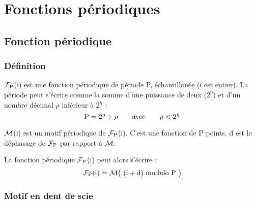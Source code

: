 
\chapter{Fonctions périodiques}

\section{Fonction périodique}
\subsection{Définition}
$\mathcal{F}_{\text{P}}$(i) est une fonction périodique de période P, échantillonée (i est
entier). La période peut s'écrire comme la somme d'une puissance de deux ($2^\eta$)
et d'un nombre décimal $\rho$ inférieur à $2^\eta$ :
\[
\text{P}=2^\eta+\rho\qquad\text{avec}\qquad\rho<2^\eta
\]

$\mathcal{M}$(i) est un motif périodique de $\mathcal{F}_{\text{P}}$(i). C'est une fonction de P
points. d est le déphasage de $\mathcal{F}_{\text{P}}$ par rapport à $\mathcal{M}$.

La fonction périodique $\mathcal{F}_{\text{P}}$(i) peut alors s'écrire :
\[
\mathcal{F}_{\text{P}}\text{(i)}=\mathcal{M}\big(\text{ (i}+\text{d) modulo P }\big)
\]

\subsection{Motif en dent de scie}

\begin{center}  \end{center}


